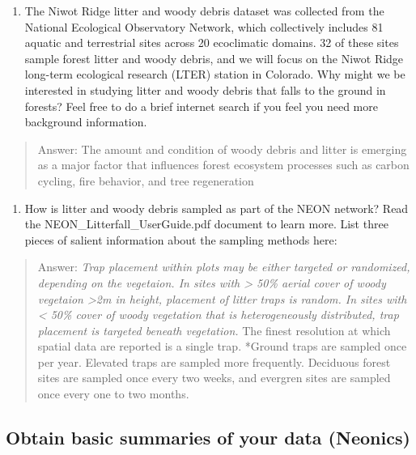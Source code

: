 \documentclass[]{article}
\providecommand{\tightlist}{%
  \setlength{\itemsep}{0pt}\setlength{\parskip}{0pt}}
\begin{document}
\begin{enumerate}
\def\labelenumi{\arabic{enumi}.}
\setcounter{enumi}{2}
\tightlist
\item
  The Niwot Ridge litter and woody debris dataset was collected from the
  National Ecological Observatory Network, which collectively includes
  81 aquatic and terrestrial sites across 20 ecoclimatic domains. 32 of
  these sites sample forest litter and woody debris, and we will focus
  on the Niwot Ridge long-term ecological research (LTER) station in
  Colorado. Why might we be interested in studying litter and woody
  debris that falls to the ground in forests? Feel free to do a brief
  internet search if you feel you need more background information.
\end{enumerate}

\begin{quote}
Answer: The amount and condition of woody debris and litter is emerging
as a major factor that influences forest ecosystem processes such as
carbon cycling, fire behavior, and tree regeneration
\end{quote}

\begin{enumerate}
\def\labelenumi{\arabic{enumi}.}
\setcounter{enumi}{3}
\tightlist
\item
  How is litter and woody debris sampled as part of the NEON network?
  Read the NEON\_Litterfall\_UserGuide.pdf document to learn more. List
  three pieces of salient information about the sampling methods here:
\end{enumerate}

\begin{quote}
Answer: \emph{Trap placement within plots may be either targeted or
randomized, depending on the vegetaion. In sites with \textgreater{}
50\% aerial cover of woody vegetaion \textgreater{}2m in height,
placement of litter traps is random. In sites with \textless{} 50\%
cover of woody vegetation that is heterogeneously distributed, trap
placement is targeted beneath vegetation. }The finest resolution at
which spatial data are reported is a single trap. *Ground traps are
sampled once per year. Elevated traps are sampled more frequently.
Deciduous forest sites are sampled once every two weeks, and evergren
sites are sampled once every one to two months.
\end{quote}

\hypertarget{obtain-basic-summaries-of-your-data-neonics}{%
\subsection{Obtain basic summaries of your data
(Neonics)}\label{obtain-basic-summaries-of-your-data-neonics}}
\end{document}
